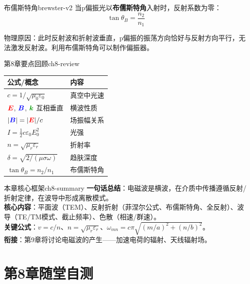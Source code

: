 \documentclass[11pt,a4paper,openany,oneside]{book}
\newcommand{\vecE}{\textcolor{red}{\vect{E}}}
\newcommand{\vecB}{\textcolor{blue}{\vect{B}}}
\newcommand{\vecK}{\textcolor{green!60!black}{\vect{k}}}
\newcommand{\eps}{\varepsilon}
\newcommand{\muz}{\mu_0}
\newcommand{\vect}[1]{\bm{#1}}
\begin{document}
\begin{insight}{布儒斯特角}{brewster-v2}
当p偏振光以\textbf{布儒斯特角}入射时，反射系数为零：
\[
\tan\theta_B = \frac{n_2}{n_1}
\]

物理原因：此时反射波和折射波垂直，p偏振的振荡方向恰好与反射方向平行，无法激发反射波。利用布儒斯特角可以制作偏振器。
\end{insight}

\begin{review}{第8章要点回顾}{ch8-review}
\begin{center}
\begin{tabular}{@{}ll@{}}
\toprule
\textbf{公式/概念} & \textbf{内容} \\
\midrule
$c = 1/\sqrt{\muz\eps_0}$ & 真空中光速 \\
$\vecE$, $\vecB$, $\vecK$ 互相垂直 & 横波性质 \\
$|\vecB| = |\vecE|/c$ & 场振幅关系 \\
$I = \frac{1}{2}c\eps_0 E_0^2$ & 光强 \\
$n = \sqrt{\mu_r\eps_r}$ & 折射率 \\
$\delta = \sqrt{2/(\mu\sigma\omega)}$ & 趋肤深度 \\
$\tan\theta_B = n_2/n_1$ & 布儒斯特角 \\
\bottomrule
\end{tabular}
\end{center}
\end{review}

\begin{tip}{本章核心框架}{ch8-summary}
\textbf{一句话总结}：电磁波是横波，在介质中传播遵循反射/折射定律，在波导中形成离散模式。\\
\textbf{核心内容}：平面波（TEM）、反射折射（菲涅尔公式、布儒斯特角、全反射）、波导（TE/TM模式、截止频率）、色散（相速/群速）。\\
\textbf{关键公式}：$v=c/n$、$n=\sqrt{\mu_r\eps_r}$、$\omega_{mn}=c\pi\sqrt{(m/a)^2+(n/b)^2}$。\\
\textbf{衔接}：第9章将讨论电磁波的产生——加速电荷的辐射、天线辐射场。
\end{tip}

\section*{第8章随堂自测}
\end{document}
